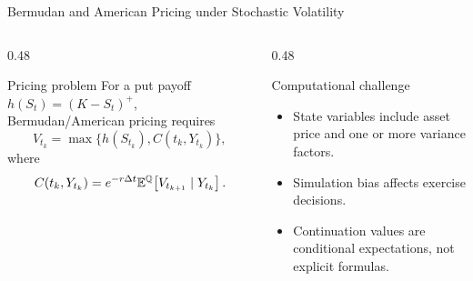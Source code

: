 \begin{frame}{Bermudan and American Pricing under Stochastic Volatility}
  \begin{columns}[T,onlytextwidth]
    \begin{column}{0.48\textwidth}
      \begin{block}{Pricing problem}
        For a put payoff \(h(S_t)=(K-S_t)^+\), Bermudan/American pricing requires
        \[
          V_{t_k}=\max\{h(S_{t_k}), C(t_k,Y_{t_k})\},
        \]
        where
        \[
          C(t_k,Y_{t_k})
          =e^{-r\Delta t}\mathbb{E}^{\mathbb{Q}}\!\left[V_{t_{k+1}}\mid Y_{t_k}\right].
        \]
      \end{block}
    \end{column}
    \begin{column}{0.48\textwidth}
      \begin{block}{Computational challenge}
        \begin{itemize}
          \item State variables include asset price and one or more variance factors.
          \item Simulation bias affects exercise decisions.
          \item Continuation values are conditional expectations, not explicit formulas.
        \end{itemize}
      \end{block}
    \end{column}
  \end{columns}

  \vspace{0.5em}
\end{frame}

